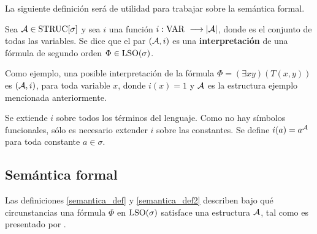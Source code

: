 La siguiente definición será de utilidad para trabajar sobre la semántica
formal.
\begin{definition}
Sea $\mathcal{A} \in \text{STRUC}[\sigma]$ y sea $i$ una función 
$i : \text{VAR}\ \longrightarrow |\mathcal{A}|$, donde  es el conjunto de
todas las variables.
Se dice que el par $(\mathcal{A}, i)$ es una \textbf{interpretación} de una fórmula de
segundo orden $\Phi \in \text{LSO}(\sigma)$.
\end{definition}
Como ejemplo, una posible interpretación de la fórmula $\Phi =
(\exists xy) (T(x, y))$
es $(\mathcal{A}, i)$, para toda variable $x$, donde $i(x) = 1$ y $\mathcal{A}$ es la estructura ejemplo mencionada
anteriormente.
\begin{definition}
Se extiende $i$ sobre todos los términos del lenguaje. Como no hay símbolos
funcionales, sólo es necesario extender $i$ sobre las constantes. Se define
$i(a) = a^{\mathcal{A}}$ para toda constante $a \in \sigma$.
\end{definition}

\subsection{Semántica formal}
Las definiciones \ref{semantica_def} y \ref{semantica_def2} describen 
bajo qué circunstancias una fórmula $\Phi$ en
$\text{LSO}(\sigma)$ satisface una estructura $\mathcal{A}$, tal como es
presentado por \cite{immerman:book}.

